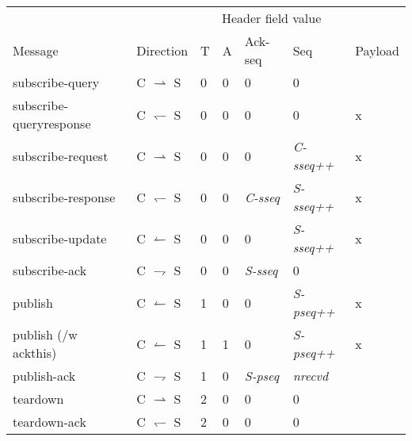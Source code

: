 \begin{tabular}{|l|l|l|l|l|l|l|}
\hline
						& 							& \multicolumn{4}{c|}{Header field value} &	\\
Message					& Direction 				& T	& A	& Ack-seq				& Seq	&	Payload \\
\hline
subscribe-query			& C $\rightharpoonup$ S		& 0	& 0 	& 0						& 0	&	\\
\hline
subscribe-queryresponse	& C $\leftharpoondown$ S	& 0	& 0		& 0						& 0	&	x \\
\hline
subscribe-request		& C $\rightharpoonup$ S		& 0	& 0		& 0						& \emph{C-sseq++} &
	x \\
\hline
subscribe-response		& C $\leftharpoondown$ S	& 0	& 0		& \emph{C-sseq}	& \emph{S-sseq++} &	
	x \\
\hline
subscribe-update		& C $\leftharpoonup$ S		& 0	& 0		& 0						& \emph{S-sseq++} &
	x \\
\hline
subscribe-ack			& C $\rightharpoondown$ S	& 0	& 0		& \emph{S-sseq}	& 0	&	\\
\hline
publish					& C $\leftharpoonup$ S		& 1	& 0		& 0						& \emph{S-pseq++} &
	x \\
\hline
publish	(/w ackthis)	& C $\leftharpoonup$ S		& 1	& 1		& 0						& \emph{S-pseq++} &
	x \\
\hline
publish-ack				& C $\rightharpoondown$ S	& 1	& 0		& \emph{S-pseq}			& \emph{nrecvd}	&	\\
\hline
teardown		& C $\rightharpoonup$ S		& 2	& 0		& 0			& 0	& \\
\hline
teardown-ack		& C $\leftharpoondown$ S 		& 2 & 0		& 0			& 0 &	\\
			
\hline
\end{tabular}